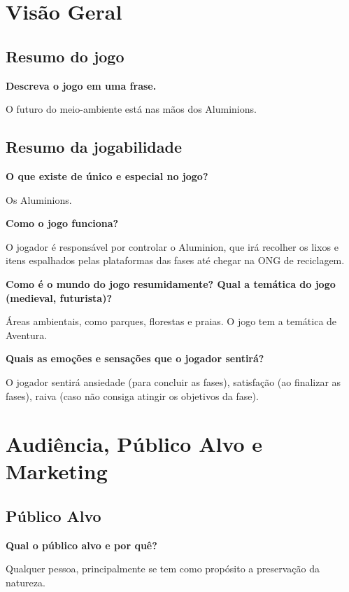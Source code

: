 \documentclass[]{scrartcl}
\begin{document}
\newpage

\section{Visão Geral}

\subsection{Resumo do jogo}

\noindent\textbf{Descreva o jogo em uma frase.}

O futuro do meio-ambiente está nas mãos dos Aluminions.

\subsection{Resumo da jogabilidade}

\noindent\textbf{O que existe de único e especial no jogo?}

Os Aluminions.

\noindent\textbf{Como o jogo funciona?}

O jogador é responsável por controlar o Aluminion, que irá recolher os lixos e itens espalhados pelas plataformas das fases até chegar na ONG de reciclagem.

\noindent\textbf{Como é o mundo do jogo resumidamente? Qual a temática do jogo (medieval, futurista)?}

Áreas ambientais, como parques, florestas e praias. O jogo tem a temática de Aventura.

\noindent\textbf{Quais as emoções e sensações que o jogador sentirá?}

O jogador sentirá ansiedade (para concluir as fases), satisfação (ao finalizar as fases), raiva (caso não consiga atingir os objetivos da fase).

\section{Audiência, Público Alvo e Marketing}

\subsection{Público Alvo}

\noindent\textbf{Qual o público alvo e por quê?}

Qualquer pessoa, principalmente se tem como propósito a preservação da natureza.
\end{document}
